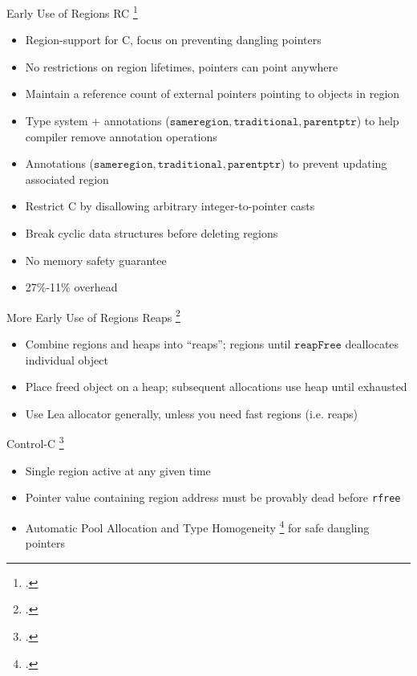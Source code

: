 \begin{frame}{Early Use of Regions}
\footnotesize
RC \footcite{gay_language_2001}
    \vspace{-0.1in}
   \begin{itemize}
     \item Region-support for C, focus on preventing dangling pointers %
     \item No restrictions on region lifetimes, pointers can point anywhere
     \item Maintain a reference count of external pointers pointing to objects in region %
     \item Type system + annotations ($\texttt{sameregion}, \texttt{traditional}, \texttt{parentptr}$) to help compiler remove annotation operations %
     \item Annotations ($\texttt{sameregion}, \texttt{traditional}, \texttt{parentptr}$) to prevent updating associated region %
     \item Restrict C by disallowing arbitrary integer-to-pointer casts
     \item Break cyclic data structures before deleting regions
     \item \alert{No} memory safety guarantee
     \item 27\%-11\% overhead
   \end{itemize}
\end{frame}

\begin{frame}{More Early Use of Regions}
Reaps \footcite{berger_reconsidering_2002}
    \vspace{-0.1in}
   \begin{itemize}
     \item Combine regions and heaps into ``reaps''; regions until $\texttt{reapFree}$ deallocates individual object
     \item Place freed object on a heap; subsequent allocations use heap until exhausted
     \item Use Lea allocator generally, unless you need fast regions (i.e. reaps) %
   \end{itemize}

Control-C \footcite{kowshik_ensuring_2002}
    \vspace{-0.1in}
    \begin{itemize}
        \item Single region active at any given time
        \item Pointer value containing region address must be provably dead before \texttt{rfree}
        \item Automatic Pool Allocation and Type Homogeneity \footcite{dhurjati_memory_2003} for safe dangling pointers 
    \end{itemize}
\end{frame}

